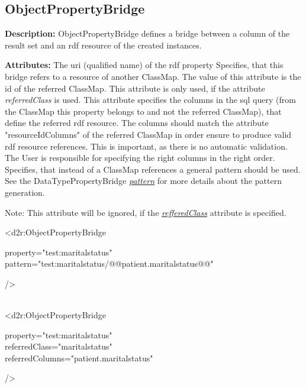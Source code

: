 \subsection{ObjectPropertyBridge}
\textbf{Description:} \newline
ObjectPropertyBridge defines a bridge between a column of the result set and an rdf resource of the created instances.

\textbf{Attributes:} \newline
{}
The uri (qualified name) of the rdf property
\EndAttribute
\label{refferedClassLabel}
Specifies, that this bridge refers to a resource of another ClassMap. 
The value of this attribute is the id of the referred ClassMap.
\EndAttribute
{}
This attribute is only used, if the attribute \emph{referredClass} is used.
This attribute specifies the columns in the sql query (from the ClassMap this property belongs to and not the referred ClassMap), that define the referred rdf resource. The columns should match the attribute "resourceIdColumns" of the referred ClassMap in order ensure to produce valid rdf resource references. This is important, as there is no automatic validation. The User is responsible for specifying the right columns in the right order.
\EndAttribute
{}
Specifies, that instead of a ClassMap references a general pattern should be used. See the DataTypePropertyBridge \hyperref[patternLabel]{\emph{pattern}} 
for more details about the pattern generation.

Note:\newline
This attribute will be ignored, if the
\hyperref[refferedClassLabel]{\emph{refferedClass}} attribute is specified.
\EndAttribute

\begin{ExampleBox}
	<d2r:ObjectPropertyBridge 
	\begin{indention}{1cm}
		property="test:maritalstatus"\\
		pattern="test:maritalstatus/@@patient.maritalstatus@@"
	\end{indention}
	/>
	
	\\
	<d2r:ObjectPropertyBridge 
	\begin{indention}{1cm}
		property="test:maritalstatus"\\
		referredClass="maritalstatus"\\
		referredColumns="patient.maritalstatus"
	\end{indention}
	/>
\end{ExampleBox}